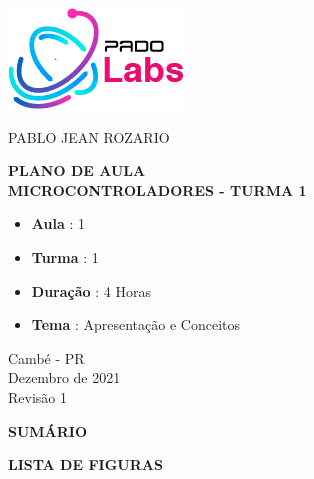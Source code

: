 \documentclass[12pt,a4paper]{report}
\newcommand\Revisao{1}
\begin{document}
%
%
\thispagestyle{empty}

\begin{center}
    \includegraphics[scale=0.7]{fig/logo.png}

    \vspace{.7cm}

    {\Large \uppercase{Pablo Jean Rozario}}

    \vspace{3cm}

    \Large \MakeUppercase{\textbf{PLANO DE AULA \\
            Microcontroladores - Turma 1 }}

    \vspace{3cm}

    \normalsize

    \begin{itemize}
        \item \textbf{Aula} : 1
        \item \textbf{Turma} : 1
        \item \textbf{Duração} : 4 Horas
        \item \textbf{Tema} : Apresentação e Conceitos
    \end{itemize}

    \vspace{3cm}

    Cambé - PR \\ Dezembro de 2021 \\ Revisão \Revisao
\end{center}

\newpage


\thispagestyle{empty}
\mbox{}
\newpage

%
%

\begingroup
\let\clearpage\relax
\newpage
\begin{center}
    \MakeUppercase{\bf Sumário}
\end{center}
\tableofcontents
\thispagestyle{empty}

\newpage
\begin{center}
    \MakeUppercase{\bf Lista de Figuras}
\end{center}
\listoffigures
\thispagestyle{empty}
\end{document}
